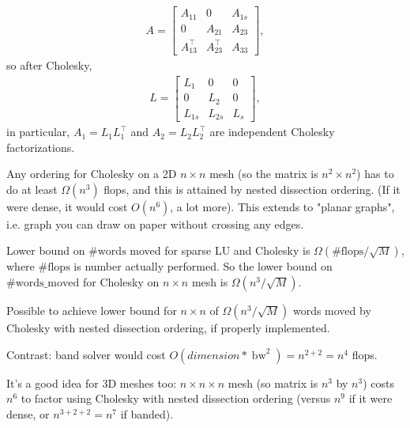 \documentclass[11pt]{article}
\numberwithin{equation}{section}
\begin{document}
\begin{itemize}
\begin{align*}
        A = \left[\begin{array}{lll}
            A_{11} & 0 & A_{1s} \\
            0 & A_{21} & A_{23} \\
            A_{13}^\top & A_{23}^\top & A_{33}
            \end{array}\right],
    \end{align*}
    so after Cholesky, \begin{align*}
        L = \left[\begin{array}{lll}
            L_{1} & 0 & 0 \\
            0 & L_2 & 0 \\
            L_{1s} & L_{2s} & L_{s}
            \end{array}\right],
    \end{align*}
    in particular, $A_1 = L_1 L_1^\top$ and $A_2 = L_2 L_2^\top$ are independent Cholesky factorizations.
\end{itemize}

\begin{theorem}
    Any ordering for Cholesky on a 2D $n \times n$ mesh (so the matrix is $n^2 \times n^2$) has to do at least $\Omega(n^3)$ flops,
    and this is attained by nested dissection ordering. (If it were dense, it would cost $O(n^6)$, a lot more).
    This extends to "planar graphs", i.e. graph you can draw on paper without crossing any edges.    
\end{theorem}

\begin{theorem}
    Lower bound on $\#\mathrm{words}$ moved for sparse LU and Cholesky is $\Omega(\#\mathrm{flops} / \sqrt{M})$, where $\#\mathrm{flops}$ is number actually performed. 
    So the lower bound on $\#\mathrm{words\_moved}$ for Cholesky on $n \times n$ mesh is $\Omega(n^3/\sqrt{M})$.
\end{theorem}

\begin{theorem}
    Possible to achieve lower bound for $n \times n$ of $\Omega(n^3/\sqrt{M})$ words moved by Cholesky with nested dissection ordering, if properly implemented.
\end{theorem}

Contrast: band solver would cost $O(dimension* \operatorname{bw}^2) =n^{2+2}=n^4$ flops.

It's a good idea for 3D meshes too: $n \times n \times n$ mesh (so matrix is $n^3$ by $n^3$) costs $n^6$ to factor using Cholesky with nested dissection ordering 
(versus $n^9$ if it were dense, or $n^{3+2+2}=n^7$ if banded).
\end{document}
